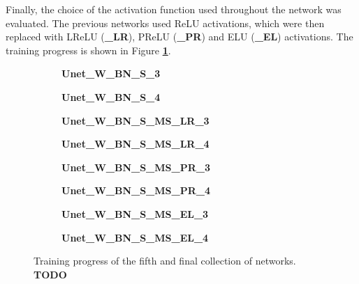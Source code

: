 Finally, the choice of the activation function used throughout the network was evaluated. The previous networks used ReLU activations, which were then replaced with LReLU (\textbf{\_LR}), PReLU (\textbf{\_PR}) and ELU (\textbf{\_EL}) activations. The training progress is shown in Figure \textbf{\ref{fig:weighted_batchnorm_shuffle_msra_acts_training}}.\\

\begin {figure}[!htb]
	\begin {subfigure}[b]{0.4\linewidth}
		\caption{\textbf{Unet\_W\_BN\_S\_3}}
	\end {subfigure}\hspace{1.75cm}
	\begin {subfigure}[b]{0.4\linewidth}
		\caption{\textbf{Unet\_W\_BN\_S\_4}}
	\end {subfigure}

	\begin {subfigure}[b]{0.4\linewidth}
		\caption{\textbf{Unet\_W\_BN\_S\_MS\_LR\_3}}
	\end {subfigure}\hspace{1.75cm}
	\begin {subfigure}[b]{0.4\linewidth}
		\caption{\textbf{Unet\_W\_BN\_S\_MS\_LR\_4}}
	\end {subfigure}

	\begin {subfigure}[b]{0.4\linewidth}
		\caption{\textbf{Unet\_W\_BN\_S\_MS\_PR\_3}}
	\end {subfigure}\hspace{1.75cm}
	\begin {subfigure}[b]{0.4\linewidth}
		\caption{\textbf{Unet\_W\_BN\_S\_MS\_PR\_4}}
	\end {subfigure}

	\begin {subfigure}[b]{0.4\linewidth}
		\caption{\textbf{Unet\_W\_BN\_S\_MS\_EL\_3}}
	\end {subfigure}\hspace{1.75cm}
	\begin {subfigure}[b]{0.4\linewidth}
		\caption{\textbf{Unet\_W\_BN\_S\_MS\_EL\_4}}
	\end {subfigure}

		\caption[Training progress of the fifth collection of networks.]{Training progress of the fifth and final collection of networks. \textbf{TODO}}
		\label{fig:weighted_batchnorm_shuffle_msra_acts_training}
\end {figure}

